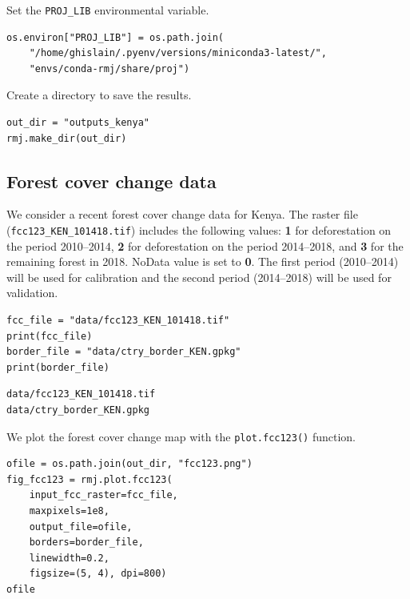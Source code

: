 \documentclass[paper=a4, 12pt, DIV=12]{scrartcl}
\begin{document}
Set the \texttt{PROJ\_LIB} environmental variable.

\begin{verbatim}
os.environ["PROJ_LIB"] = os.path.join(
    "/home/ghislain/.pyenv/versions/miniconda3-latest/",
    "envs/conda-rmj/share/proj")
\end{verbatim}

Create a directory to save the results.

\begin{verbatim}
out_dir = "outputs_kenya"
rmj.make_dir(out_dir)
\end{verbatim}

\subsection{Forest cover change data}
\label{sec:org8490684}

We consider a recent forest cover change data for Kenya. The raster file (\texttt{fcc123\_KEN\_101418.tif}) includes the following values: \textbf{1} for deforestation on the period 2010--2014, \textbf{2} for deforestation on the period 2014--2018, and \textbf{3} for the remaining forest in 2018. NoData value is set to \textbf{0}. The first period (2010--2014) will be used for calibration and the second period (2014--2018) will be used for validation.

\begin{verbatim}
fcc_file = "data/fcc123_KEN_101418.tif"
print(fcc_file)
border_file = "data/ctry_border_KEN.gpkg"
print(border_file)
\end{verbatim}

\begin{verbatim}
data/fcc123_KEN_101418.tif
data/ctry_border_KEN.gpkg
\end{verbatim}


We plot the forest cover change map with the \texttt{plot.fcc123()} function.

\begin{verbatim}
ofile = os.path.join(out_dir, "fcc123.png")
fig_fcc123 = rmj.plot.fcc123(
    input_fcc_raster=fcc_file,
    maxpixels=1e8,
    output_file=ofile,
    borders=border_file,
    linewidth=0.2,
    figsize=(5, 4), dpi=800)
ofile
\end{verbatim}
\end{document}
